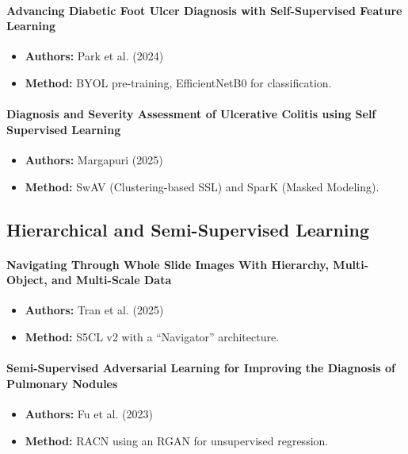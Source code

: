 \documentclass[conference]{IEEEtran}
\begin{document}
\paragraph{Advancing Diabetic Foot Ulcer Diagnosis with Self-Supervised Feature Learning}
\begin{itemize}
\item \textbf{Authors:} Park et al. (2024) \cite{park2024}
\item \textbf{Method:} BYOL pre-training, EfficientNetB0 for classification.
\end{itemize}

\paragraph{Diagnosis and Severity Assessment of Ulcerative Colitis using Self Supervised Learning}
\begin{itemize}
\item \textbf{Authors:} Margapuri (2025) \cite{margapuri2025}
\item \textbf{Method:} SwAV (Clustering-based SSL) and SparK (Masked Modeling).
\end{itemize}

\subsection{Hierarchical and Semi-Supervised Learning}

\paragraph{Navigating Through Whole Slide Images With Hierarchy, Multi-Object, and Multi-Scale Data}
\begin{itemize}
\item \textbf{Authors:} Tran et al. (2025) \cite{tran2025}
\item \textbf{Method:} S5CL v2 with a ``Navigator'' architecture.
\end{itemize}

\paragraph{Semi-Supervised Adversarial Learning for Improving the Diagnosis of Pulmonary Nodules}
\begin{itemize}
\item \textbf{Authors:} Fu et al. (2023) \cite{fu2023}
\item \textbf{Method:} RACN using an RGAN for unsupervised regression.
\end{itemize}
\end{document}
